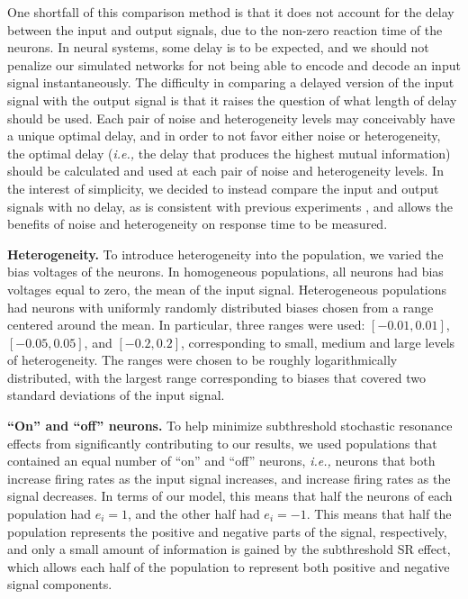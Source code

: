 \documentclass[12pt]{article}
\newcommand{\ie}{\emph{i.e., }}
\begin{document}
One shortfall of this comparison method is that it does not account for the delay between the input and output signals, due to the non-zero reaction time of the neurons. In neural systems, some delay is to be expected, and we should not penalize our simulated networks for not being able to encode and decode an input signal instantaneously. The difficulty in comparing a delayed version of the input signal with the output signal is that it raises the question of what length of delay should be used. Each pair of noise and heterogeneity levels may conceivably have a unique optimal delay, and in order to not favor either noise or heterogeneity, the optimal delay (\ie the delay that produces the highest mutual information) should be calculated and used at each pair of noise and heterogeneity levels. In the interest of simplicity, we decided to instead compare the input and output signals with no delay, as is consistent with previous experiments \citep{Stocks2001}, and allows the benefits of noise and heterogeneity on response time to be measured.

\textbf{Heterogeneity.} To introduce heterogeneity into the population, we varied the bias voltages of the neurons. In homogeneous populations, all neurons had bias voltages equal to zero, the mean of the input signal. Heterogeneous populations had neurons with uniformly randomly distributed biases chosen from a range centered around the mean. In particular, three ranges were used: $[-0.01,0.01]$, $[-0.05,0.05]$, and $[-0.2,0.2]$, corresponding to small, medium and large levels of heterogeneity. The ranges were chosen to be roughly logarithmically distributed, with the largest range corresponding to biases that covered two standard deviations of the input signal.

\textbf{``On'' and ``off'' neurons.} To help minimize subthreshold stochastic resonance effects from significantly contributing to our results, we used populations that contained an equal number of ``on'' and ``off'' neurons, \ie neurons that both increase firing rates as the input signal increases, and increase firing rates as the signal decreases. In terms of our model, this means that half the neurons of each population had $e_i = 1$, and the other half had $e_i = -1$. This means that half the population represents the positive and negative parts of the signal, respectively, and only a small amount of information is gained by the subthreshold SR effect, which allows each half of the population to represent both positive and negative signal components.
\end{document}
